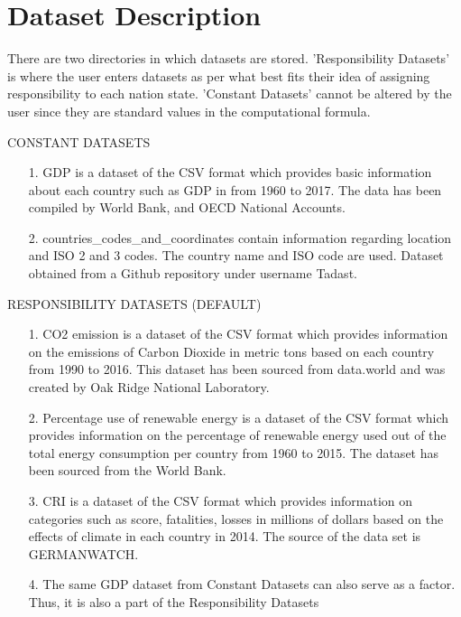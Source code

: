 \documentclass[fontsize=11pt]{article}
\begin{document}
    \section*{Dataset Description}

    There are two directories in which datasets are stored. 'Responsibility Datasets' is where the user enters datasets as per what best fits their idea of assigning responsibility to each nation state. 'Constant Datasets' cannot be altered by the user since they are standard values in the computational formula.


    \begin{center}
        CONSTANT DATASETS
    \end{center}

    \begin{enumerate}


        \item [1.] GDP is a dataset of the CSV format which provides basic information about each country such as GDP in from 1960 to 2017. The data has been compiled by World Bank, and OECD National Accounts.

        \item [2.]  countries\_codes\_and\_coordinates contain information regarding location and ISO 2 and 3 codes. The country name and ISO code are used. Dataset obtained from a Github repository under username Tadast.

    \end{enumerate} \newpage

    \begin{center}
        RESPONSIBILITY DATASETS (DEFAULT)
    \end{center}

    \begin{enumerate}
        \item [1.] CO2 emission is a dataset of the CSV format which provides information on the emissions of Carbon Dioxide in metric tons based on each country from 1990 to 2016. This dataset has been sourced from data.world and was created by Oak Ridge National Laboratory.

        \item [2.] Percentage use of renewable energy is a dataset of the CSV format which provides information on the percentage of renewable energy used out of the total energy consumption per country from 1960 to 2015. The dataset has been sourced from the World Bank.

        \item [3.] CRI is a dataset of the CSV format which provides information on categories such as score, fatalities, losses in millions of dollars based on the effects of climate in each country in 2014. The source of the data set is GERMANWATCH.

        \item [4.] The same GDP dataset from Constant Datasets can also serve as a factor. Thus, it is also a part of the Responsibility Datasets

    \end{enumerate}
\end{document}
